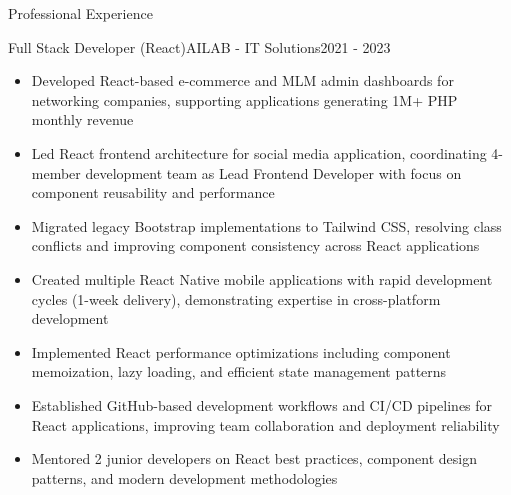 \documentclass[]{mcdowellcv}
\begin{document}
\begin{cvsection}{Professional Experience}
		\begin{cvsubsection}{Full Stack Developer (React)}{AILAB - IT Solutions}{2021 - 2023}
			\begin{itemize}
				\item Developed React-based e-commerce and MLM admin dashboards for networking companies, supporting applications generating 1M+ PHP monthly revenue
				\item Led React frontend architecture for social media application, coordinating 4-member development team as Lead Frontend Developer with focus on component reusability and performance
				\item Migrated legacy Bootstrap implementations to Tailwind CSS, resolving class conflicts and improving component consistency across React applications
				\item Created multiple React Native mobile applications with rapid development cycles (1-week delivery), demonstrating expertise in cross-platform development
				\item Implemented React performance optimizations including component memoization, lazy loading, and efficient state management patterns
				\item Established GitHub-based development workflows and CI/CD pipelines for React applications, improving team collaboration and deployment reliability
				\item Mentored 2 junior developers on React best practices, component design patterns, and modern development methodologies
			\end{itemize}
		\end{cvsubsection}
	\end{cvsection}
\end{document}
